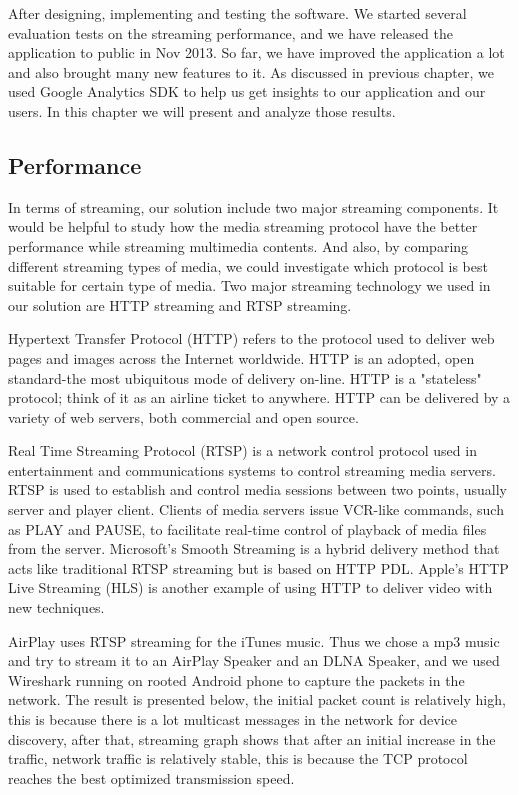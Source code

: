 
After designing, implementing and testing the software. We started several
evaluation tests on the streaming performance, and we have released the
application to public in Nov 2013. So far, we have improved the application a
lot and also brought many new features to it. As discussed in previous chapter,
we used Google Analytics SDK to help us get insights to our application and our
users. In this chapter we will present and analyze those results.

\subsection{Performance}
In terms of streaming, our solution include two major streaming components. It
would be helpful to study how the media streaming protocol have the better 
performance while streaming multimedia contents. And also, by comparing
different streaming types of media, we could investigate which protocol is best
suitable for certain type of media. Two major streaming technology we
used in our solution are HTTP streaming and RTSP streaming.

Hypertext Transfer Protocol (HTTP) refers to the protocol used to deliver web
pages and images across the Internet worldwide. HTTP is an adopted, open
standard-the most ubiquitous mode of delivery on-line. HTTP is a "stateless"
protocol; think of it as an airline ticket to anywhere. HTTP can be delivered
by a variety of web servers, both commercial and open source.

Real Time Streaming Protocol (RTSP) is a network control protocol used in
entertainment and communications systems to control streaming media servers.
RTSP is used to establish and control media sessions between two points,
usually server and player client. Clients of media servers issue VCR-like
commands, such as PLAY and PAUSE, to facilitate real-time control of playback
of media files from the server. Microsoft's Smooth Streaming is a hybrid
delivery method that acts like traditional RTSP streaming but is based on HTTP
PDL. Apple's HTTP Live Streaming (HLS) is another example of using HTTP to
deliver video with new techniques.

AirPlay uses RTSP streaming for the iTunes music. Thus we chose a mp3 music and
try to stream it to an AirPlay Speaker and an DLNA Speaker, and we used
Wireshark running on rooted Android phone to capture the packets in the network.
The result is presented below, the initial packet count is relatively high,
this is because there is a lot multicast messages in the network for device
discovery, after that, streaming graph shows that after an initial increase in
the traffic, network traffic is relatively stable, this is because the TCP
protocol reaches the best optimized transmission speed.

